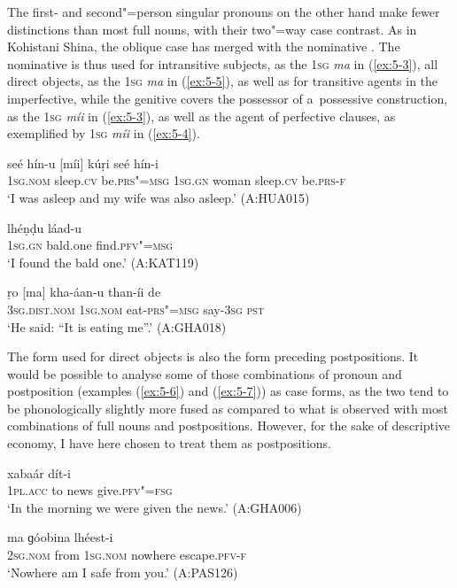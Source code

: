The first- and second"=person singular pronouns on the other hand make fewer distinctions than most full nouns, with their two"=way case contrast. As in Kohistani Shina, the oblique case has merged with the nominative \citep[82]{schmidtkohistani2008}. The nominative is thus used for intransitive subjects, as the \textsc{1sg} \textit{ma} in (\ref{ex:5-3}), all direct objects, as the \textsc{1sg} \textit{ma} in (\ref{ex:5-5}), as well as for transitive agents in the imperfective, while the genitive covers the possessor of a~possessive construction, as the \textsc{1sg} \textit{míi} in (\ref{ex:5-3}), as well as the agent of perfective clauses, as exemplified by \textsc{1sg} \textit{míi} in (\ref{ex:5-4}). 


\begin{exe}
\ex
\label{ex:5-3}
\gll [ma] seé hín-u [míi] kúṛi seé hín-i \\
	\textsc{1sg.nom} sleep.\textsc{cv} be.\textsc{prs"=msg} \textsc{1sg.gn} woman sleep.\textsc{cv} be.\textsc{prs-f} \\
\glt `I was asleep and my wife was also asleep.' (A:HUA015)

\ex
\label{ex:5-4}
\gll [míi] lhéṇḍu láad-u \\
	\textsc{1sg.gn} bald.one find.\textsc{pfv"=msg} \\
\glt `I found the bald one.' (A:KAT119)

\ex
\label{ex:5-5}
\gll ṛo [ma] kha-áan-u than-íi de \\
	\textsc{3sg.dist.nom} \textsc{1sg.nom} eat-\textsc{prs"=msg} say-\textsc{3sg} \textsc{pst} \\
\glt `He said: ``It is eating me''.' (A:GHA018)
\end{exe}

The form used for direct objects is also the form preceding postpositions. It would be possible to analyse some of those combinations of pronoun and postposition (examples (\ref{ex:5-6}) and (\ref{ex:5-7})) as case forms, as the two tend to be phonologically slightly more fused as compared to what is observed with most combinations of full nouns and postpositions. However, for the sake of descriptive economy, I have here chosen to treat them as postpositions. 

\begin{exe}
\ex
\label{ex:5-6}
 xabaár dít-i \\
	1\textsc{pl}.\textsc{acc} to news give.\textsc{pfv"=fsg} \\
\glt `In the morning we were given the news.' (A:GHA006)

\ex
\label{ex:5-7}
\gll [tu díi] ma ɡóobina lhéest-i \\
\textsc{2sg.nom} from \textsc{1sg.nom} nowhere escape.\textsc{pfv-f} \\
\glt `Nowhere am I safe from you.' (A:PAS126)
\end{exe}


